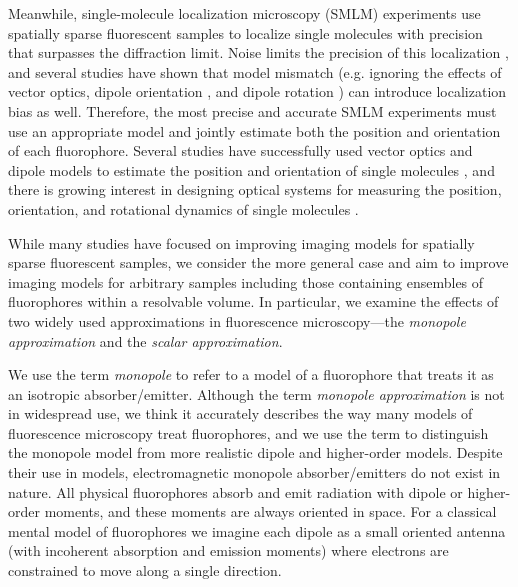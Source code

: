 \documentclass[]{osa-article}
\begin{document}
Meanwhile, single-molecule localization microscopy (SMLM) experiments use
spatially sparse fluorescent samples to localize single molecules with precision
that surpasses the diffraction limit. Noise limits the precision of this
localization \cite{foreman2011, chao2016}, and several studies have shown that
model mismatch (e.g. ignoring the effects of vector optics, dipole orientation
\cite{backlund2014}, and dipole rotation \cite{lew2013}) can introduce
localization bias as well. Therefore, the most precise and accurate SMLM
experiments must use an appropriate model and jointly estimate both the position
and orientation of each fluorophore. Several studies have successfully used
vector optics and dipole models to estimate the position and orientation of
single molecules \cite{bohmer2003, lieb2004, toprak2006, aguet2009,
  mortensen2010}, and there is growing interest in designing optical systems for
measuring the position, orientation, and rotational dynamics of single molecules
\cite{agrawal2012, backer2014, stallinga2015, zhang2018, zhang2018-2}.

While many studies have focused on improving imaging models for spatially sparse
fluorescent samples, we consider the more general case and aim to improve
imaging models for arbitrary samples including those containing ensembles of
fluorophores within a resolvable volume. In particular, we examine the effects
of two widely used approximations in fluorescence microscopy---the
\textit{monopole approximation} and the \textit{scalar approximation}.

We use the term \textit{monopole} to refer to a model of a fluorophore that
treats it as an isotropic absorber/emitter. Although the term \textit{monopole
  approximation} is not in widespread use, we think it accurately describes the
way many models of fluorescence microscopy treat fluorophores, and we use the
term to distinguish the monopole model from more realistic dipole and
higher-order models. Despite their use in models, electromagnetic monopole
absorber/emitters do not exist in nature. All physical fluorophores absorb and
emit radiation with dipole or higher-order moments, and these moments are always
oriented in space. For a classical mental model of fluorophores we imagine each
dipole as a small oriented antenna (with incoherent absorption and emission
moments) where electrons are constrained to move along a single direction. 

\end{document}
